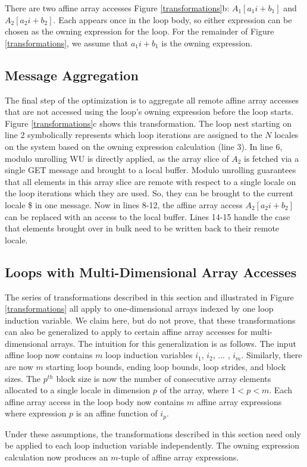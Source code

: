 There are two affine array accesses Figure \ref{transformations}b: $A_{1}[a_{1}i+b_{1}]$ and $A_{2}[a_{2}i+b_{2}]$. Each appears once in the loop body, so either expression can be chosen as the owning expression for the loop. For the remainder of Figure \ref{transformations}, we assume that $a_{1}i+b_{1}$ is the owning expression. 

\subsection{Message Aggregation}\label{subsec:message_aggregation}

The final step of the optimization is to aggregate all remote affine array accesses that are not accessed using the loop's owning expression before the loop starts. Figure \ref{transformations}c shows this transformation. The loop nest starting on line 2 symbolically represents which loop iterations are assigned to the $N$ locales on the system based on the owning expression calculation (line 3). In line 6, modulo unrolling WU is directly applied, as the array slice of $A_{2}$ is fetched via a single GET message and brought to a local buffer. Modulo unrolling guarantees that all elements in this array slice are remote with respect to a single locale on the loop iterations which they are used. So, they can be brought to the current locale \$ in one message. Now in lines 8-12, the affine array access $A_{2}[a_{2}i+b_{2}]$ can be replaced with an access to the local buffer. Lines 14-15 handle the case that elements brought over in bulk need to be written back to their remote locale. 

\subsection{Loops with Multi-Dimensional Array Accesses}\label{subsec:multi_dimensional}

The series of transformations described in this section and illustrated in Figure \ref{transformations} all apply to one-dimensional arrays indexed by one loop induction variable. We claim here, but do not prove, that these transformations can also be generalized to apply to certain affine array accesses for multi-dimensional arrays. The intuition for this generalization is as follows. The input affine loop now contains $m$ loop induction variables $i_{1}$, $i_{2}$, ... , $i_{m}$. Similarly, there are now $m$ starting loop bounds, ending loop bounds, loop strides, and block sizes. The $p^{th}$ block size is now the number of consecutive array elements allocated to a single locale in dimension $p$ of the array, where $1 < p < m$. Each affine array access in the loop body now contains $m$ affine array expressions where expression $p$ is an affine function of $i_{p}$. 

Under these assumptions, the transformations described in this section need only be applied to each loop induction variable independently. The owning expression calculation now produces an $m$-tuple of affine array expressions. 

 


